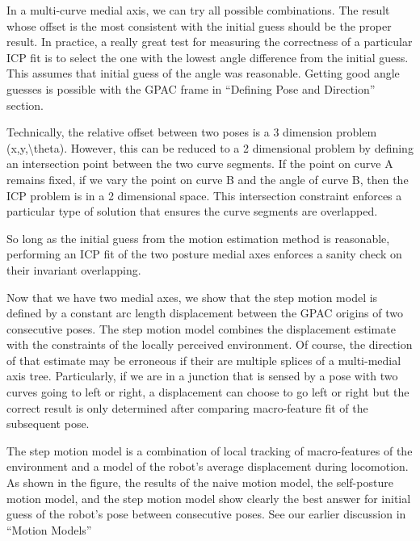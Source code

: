 In a multi-curve medial axis, we can try all possible combinations. The result whose offset is the most consistent with the initial guess should be the proper result. In practice, a really great test for measuring the correctness of a particular ICP fit is to select the one with the lowest angle difference from the initial guess. This assumes that initial guess of the angle was reasonable. Getting good angle guesses is possible with the GPAC frame in “Defining Pose and Direction” section.

Technically, the relative offset between two poses is a 3 dimension problem (x,y,\textbackslash{}theta). However, this can be reduced to a 2 dimensional problem by defining an intersection point between the two curve segments. If the point on curve A remains fixed, if we vary the point on curve B and the angle of curve B, then the ICP problem is in a 2 dimensional space. This intersection constraint enforces a particular type of solution that ensures the curve segments are overlapped.

So long as the initial guess from the motion estimation method is reasonable, performing an ICP fit of the two posture medial axes enforces a sanity check on their invariant overlapping. 

Now that we have two medial axes, we show that the step motion model is defined by a constant arc length displacement between the GPAC origins of two consecutive poses. The step motion model combines the displacement estimate with the constraints of the locally perceived environment. Of course, the direction of that estimate may be erroneous if their are multiple splices of a multi-medial axis tree. Particularly, if we are in a junction that is sensed by a pose with two curves going to left or right, a displacement can choose to go left or right but the correct result is only determined after comparing macro-feature fit of the subsequent pose.

The step motion model is a combination of local tracking of macro-features of the environment and a model of the robot’s average displacement during locomotion. As shown in the figure, the results of the naive motion model, the self-posture motion model, and the step motion model show clearly the best answer for initial guess of the robot’s pose between consecutive poses. See our earlier discussion in “Motion Models”

\section{Paired Pose Correction}
\label{pairedposecorrection}

